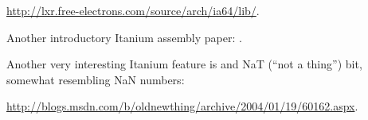 \url{http://lxr.free-electrons.com/source/arch/ia64/lib/}.

{Another introductory Itanium assembly paper}: \cite{Itanium}.

{Another very interesting Itanium feature is  and NaT (``not a thing'') bit,
somewhat resembling \gls{NaN} numbers}:

\url{http://blogs.msdn.com/b/oldnewthing/archive/2004/01/19/60162.aspx}.

